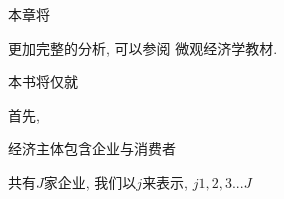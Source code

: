 



本章将

更加完整的分析, 可以参阅 微观经济学教材.

本书将仅就

首先,


经济主体包含企业与消费者

共有$J$家企业, 我们以$j$来表示, $j  {1, 2, 3... J}$

